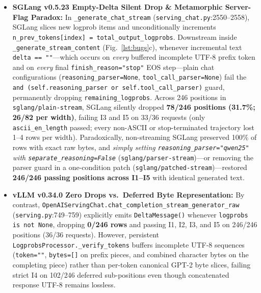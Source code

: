 \documentclass[11pt,letterpaper]{article}
\begin{document}
\begin{itemize}
\item \textbf{SGLang v0.5.23 Empty-Delta Silent Drop \& Metamorphic Server-Flag Paradox:} In \texttt{\_generate\_\allowbreak chat\_\allowbreak stream} (\texttt{serving\_\allowbreak chat.py}:2550--2558), SGLang slices new logprob items and unconditionally increments \texttt{n\_\allowbreak prev\_\allowbreak tokens[index] = total\_\allowbreak output\_\allowbreak logprobs}. Downstream inside \texttt{\_generate\_\allowbreak stream\_\allowbreak content} (Fig.~\ref{lst:bugs}c), whenever incremental text \texttt{delta == ""}---which occurs on \emph{every} buffered incomplete UTF-8 prefix token and on \emph{every} final \texttt{finish\_\allowbreak reason="stop"} EOS step---plain chat configurations (\texttt{reasoning\_\allowbreak parser=None}, \texttt{tool\_\allowbreak call\_\allowbreak parser=None}) fail the \texttt{and (self.reasoning\_\allowbreak parser or self.tool\_\allowbreak call\_\allowbreak parser)} guard, permanently dropping \texttt{remaining\_\allowbreak logprobs}. Across 246 positions in \texttt{sglang/plain-stream}, SGLang silently dropped \textbf{78/246 positions (31.7\%; 26/82 per width)}, failing \textsc{I3} and \textsc{I5} on 33/36 requests (only \texttt{ascii\_en\_length} passed; every non-ASCII or stop-terminated trajectory lost 1--4 rows per width). Paradoxically, non-streaming SGLang preserved 100\% of rows with exact raw bytes, and \emph{simply setting \texttt{reasoning\_\allowbreak parser="qwen25"} with \texttt{separate\_\allowbreak reasoning=False}} (\texttt{sglang/parser-stream})---or removing the parser guard in a one-condition patch (\texttt{sglang/patched-stream})---restored \textbf{246/246 passing positions across \textsc{I1}--\textsc{I5}} with identical generated text.
\item \textbf{vLLM v0.34.0 Zero Drops vs.\ Deferred Byte Representation:} By contrast, \texttt{OpenAI\allowbreak Serving\allowbreak Chat.\allowbreak chat\_\allowbreak completion\_\allowbreak stream\_\allowbreak generator\_\allowbreak raw} (\texttt{serving.py}:749--759) explicitly emits \texttt{DeltaMessage()} whenever \texttt{logprobs is not None}, dropping \textbf{0/246 rows} and passing \textsc{I1}, \textsc{I2}, \textsc{I3}, and \textsc{I5} on 246/246 positions (36/36 requests). However, persistent \texttt{Logprobs\allowbreak Processor.\allowbreak \_verify\_\allowbreak tokens} buffers incomplete UTF-8 sequences (\texttt{token=""}, \texttt{bytes=[]} on prefix pieces, and combined character bytes on the completing piece) rather than per-token canonical GPT-2 byte slices, failing strict \textsc{I4} on 102/246 deferred sub-positions even though concatenated response UTF-8 remains lossless.
\end{itemize}
\end{document}
